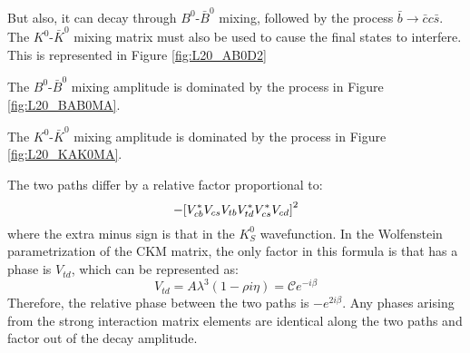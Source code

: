 \documentclass[../../main/main.tex]{subfiles}
\begin{document}

But also, it can decay through \( B^0 \)-\( \bar{B}^0 \) mixing, followed by the process \( \bar{b} \rightarrow \bar{c}c\bar{s} \). The \( K^0 \)-\( \bar{K}^0 \) mixing matrix must also be used to cause the final states to interfere. This is represented in Figure \ref{fig:L20_AB0D2}


The \( B^0 \)-\( \bar{B}^0 \) mixing amplitude is dominated by the process in Figure \ref{fig:L20_BAB0MA}.


The \( K^0 \)-\( \bar{K}^0 \) mixing amplitude is dominated by the process in Figure \ref{fig:L20_KAK0MA}.


The two paths differ by a relative factor proportional to:
\begin{equation}
	- \qty[V^*_{cb} V_{cs} V_{tb} V^*_{td} V^*_{cs} V_{cd}]^2
	\label{eq:}
\end{equation}
where the extra minus sign is that in the \( K^0_S \) wavefunction. In the Wolfenstein parametrization of the CKM matrix, the only factor in this formula is that has a phase is \( V_{td} \), which can be represented as:
\begin{equation}
	V_{td}
	=
	A \lambda^3 (1 - \rho i \eta)
	=
	\mathcal{C} e^{-i \beta}
	\label{eq:}
\end{equation}
Therefore, the relative phase between the two paths is \( - e^{2 i \beta} \). Any phases arising from the strong interaction matrix elements are identical along the two paths and factor out of the decay amplitude.
\end{document}
